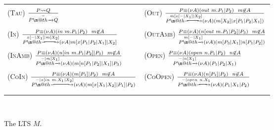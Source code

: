 \documentclass[copyright,creativecommons]{eptcs}
\makeatletter
\def\tr#1{\stackrel{#1}{\to}}
\let\oldrightarrow\to
\renewcommand{\to}[1][]{\ifthenelse{\equal{#1}{}}{\oldrightarrow}{\ensuremath{\xrightarrow{{}_{#1}}}}}
\def \rightarrowfill{\m@th\mathord{\smash-}\mkern-6mu\cleaders\hbox{$\mkern-2mu\mathord{\smash-}\mkern-2mu$}\hfill
  \mkern-6mu\mathord\rightarrow}
\def\tr#1{\stackrel{#1}{\rightarrowfill}}
\newcommand{\react}{\rightsquigarrow}
\newcommand{\<}{\langle}
\renewcommand{\>}{\rangle}
\def\tr#1{\stackrel{#1}{\rightarrowfill}}
\def \rightarrowfill{\m@th\mathord{\smash-}\mkern-6mu\cleaders\hbox{$\mkern-2mu\mathord{\smash-}\mkern-2mu$}\hfill
  \mkern-6mu\mathord\rightarrow}
\makeatother
\begin{document}
\begin{figure}[!t]
\begin{center}
\begin{tabular}{p{6.5 cm} p{6 cm}}
\hline \\
\textsc{\scriptsize(Tau)}
$\frac{P \react Q} {P \tr{-} Q}$
& \textsc{\scriptsize (Out)}
$\frac{P \equiv (\nu A) (out \hspace{1mm} m.P_1|P_2)
\hspace{2mm} m \not \in A}
      {P \tr{m[x[-|X_1]|X_2]} (\nu A) (m[X_2]| x[P_1|P_2|X_1])}$
\\ \\
\textsc{\scriptsize(In)}
$\frac{P \equiv (\nu A) (in \hspace{1mm} m.P_1|P_2)
\hspace{2mm} m \not \in A}
      {P \tr{x[-|X_1] | m[X_2]} (\nu A) m[x[P_1|P_2|X_1]|X_2]}$
& \textsc{\scriptsize(OutAmb)} $\frac{P \equiv (\nu A) (n[out \hspace{1mm}
m.P_1|P_2]|P_3) \hspace{2mm} m \not \in A}
         {P \tr{m[-|X_1]} (\nu A) (m[P_3|X_1]| n[P_1|P_2])}$
\\ \\
\textsc{\scriptsize (InAmb)}
$\frac{P \equiv (\nu A) (n[in \hspace{1mm}
m.P_1|P_2] |P_3) \hspace{2mm} m \not \in A}
      {P \tr{-|m[X_1]} (\nu A) (m[n[P_1|P_2]|X_1] | P_3)}$
& \textsc{\scriptsize(Open)} $\frac{P \equiv (\nu A) (open \hspace{1mm} n.P_1
|P_2) \hspace{2mm} n \not \in A}
      {P \tr{-|n[X_1]} (\nu A) (P_1|P_2|X_1)}$
\\ \\
\textsc{\scriptsize (CoIn)}
$\frac{P \equiv (\nu A) (m[P_1]|P_2) \hspace{2mm} m
\not \in A}
         {P \tr{-|x[in \hspace{1mm} m.X_1|X_2]} (\nu A) (m[x[X_1|X_2]|P_1]|P_2)}$
& \textsc{\scriptsize (CoOpen)} $\frac{P \equiv (\nu A) (n[P_1]|P_2) \hspace{2mm}
n \not \in A}
         {P \tr{-|open \hspace{1mm} n.X_1} (\nu A) (P_1|X_1| P_2)}$\\ \\
\hline \\
\end{tabular} \\
\caption{The LTS $M$.} \label{TableLTSProc2}
\end{center}
\end{figure}
\end{document}
